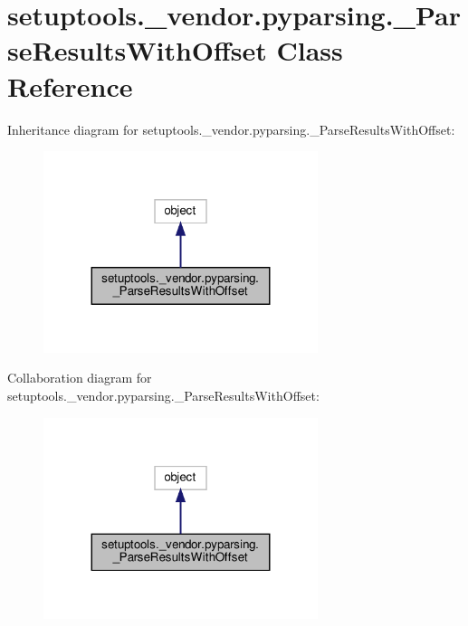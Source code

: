 \hypertarget{classsetuptools_1_1__vendor_1_1pyparsing_1_1__ParseResultsWithOffset}{}\section{setuptools.\+\_\+vendor.\+pyparsing.\+\_\+\+Parse\+Results\+With\+Offset Class Reference}
\label{classsetuptools_1_1__vendor_1_1pyparsing_1_1__ParseResultsWithOffset}


Inheritance diagram for setuptools.\+\_\+vendor.\+pyparsing.\+\_\+\+Parse\+Results\+With\+Offset\+:
\nopagebreak
\begin{figure}[H]
\begin{center}
\leavevmode
\includegraphics[width=227pt]{classsetuptools_1_1__vendor_1_1pyparsing_1_1__ParseResultsWithOffset__inherit__graph}
\end{center}
\end{figure}


Collaboration diagram for setuptools.\+\_\+vendor.\+pyparsing.\+\_\+\+Parse\+Results\+With\+Offset\+:
\nopagebreak
\begin{figure}[H]
\begin{center}
\leavevmode
\includegraphics[width=227pt]{classsetuptools_1_1__vendor_1_1pyparsing_1_1__ParseResultsWithOffset__coll__graph}
\end{center}
\end{figure}
